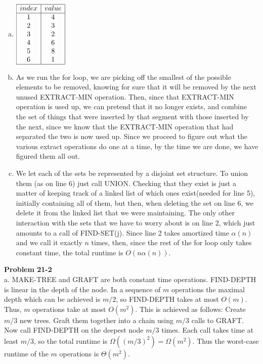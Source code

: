 \documentclass{article}
\begin{document}
\begin{enumerate}[a.]
\item
$
\begin{array}{|c|c|}
\hline
index&value\\
\hline
1&4\\
2&3\\
3&2\\
4&6\\
5&8\\
6&1\\
\hline
\end{array}
$

\item
As we run the for loop, we are picking off the smallest of the possible elements to be removed, knowing for sure that it will be removed by the next unused EXTRACT-MIN operation. Then, since that EXTRACT-MIN operation is used up, we can pretend that it no longer exists, and combine the set of things that were inserted by that segment with those inserted by the next, since we know that the EXTRACT-MIN operation that had separated the two is now used up. Since we proceed to figure out what the various extract operations do one at a time, by the time we are done, we have figured them all out.

\item
We let each of the sets be represented by a disjoint set structure. To union them (as on line 6) just call UNION. Checking that they exist is just a matter of keeping track of a linked list of which ones exist(needed for line 5), initially containing all of them, but then, when deleting the set on line 6, we delete it from the linked list that we were maintaining. The only other interaction with the sets that we have to worry about is on line 2, which just amounts to a call of FIND-SET(j). Since line 2 takes amortized time $\alpha(n)$ and we call it exactly $n$ times, then, since the rest of the for loop only takes constant time, the total runtime is $O(n\alpha(n))$.

\end{enumerate}

\noindent\textbf{Problem 21-2}\\

a. MAKE-TREE and GRAFT are both constant time operations.  FIND-DEPTH is linear in the depth of the node.  In a sequence of $m$ operations the maximal depth which can be achieved is $m/2$, so FIND-DEPTH takes at most $O(m)$.  Thus, $m$ operations take at most $O(m^2)$.  This is achieved as follows: Create $m/3$ new trees.  Graft them together into a chain using $m/3$ calls to GRAFT.  Now call FIND-DEPTH on the deepest node $m/3$ times.  Each call takes time at least $m/3$, so the total runtime is $\Omega((m/3)^2) = \Omega(m^2)$.  Thus the worst-case runtime of the $m$ operations is $\Theta(m^2)$. \\
\end{document}
